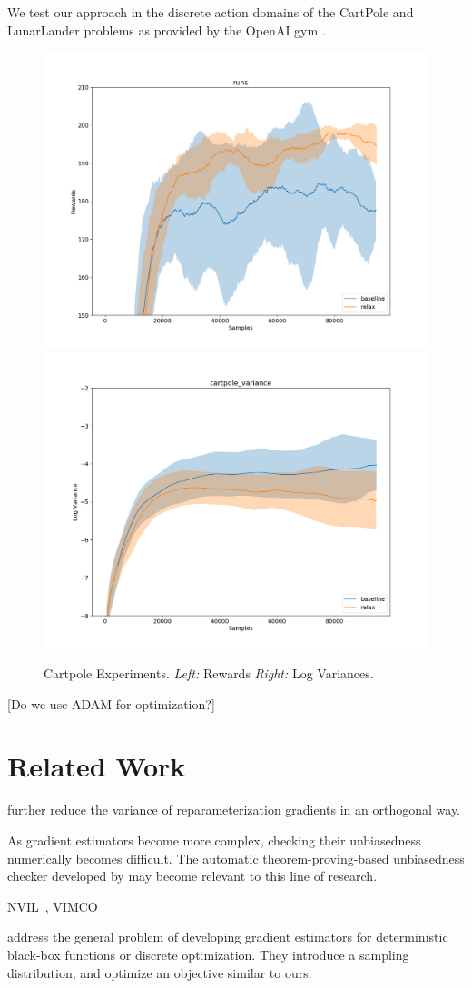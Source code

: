 \documentclass{article}
\begin{document}
We test our approach in the discrete action domains of the CartPole and LunarLander problems as provided by the OpenAI gym \cite{1606.01540}.
\begin{figure}[h]
\begin{center}
\includegraphics[width=.4\textwidth]{figures/cartpole_rewards}
\includegraphics[width=.4\textwidth]{figures/cartpole_var}
\label{first figure}
\end{center}
\caption{Cartpole Experiments.
\emph{Left:} Rewards
\emph{Right:} Log Variances.
}
\end{figure}

\citet{mnih-dqn-2015}

[Do we use ADAM \citep{kingma2015adam} for optimization?]





\section{Related Work}
\label{related work}

\citet{miller2017reducing} further reduce the variance of reparameterization gradients in an orthogonal way.

As gradient estimators become more complex, checking their unbiasedness numerically becomes difficult.
The automatic theorem-proving-based unbiasedness checker developed by \citet{selsam2017developing} may become relevant to this line of research.

NVIL~\citep{mnih2014neural}, VIMCO~\citep{mnih2016variational}

\citet{staines2012variational} address the general problem of developing gradient estimators for deterministic black-box functions or discrete optimization.
They introduce a sampling distribution, and optimize an objective similar to ours. 
\end{document}
